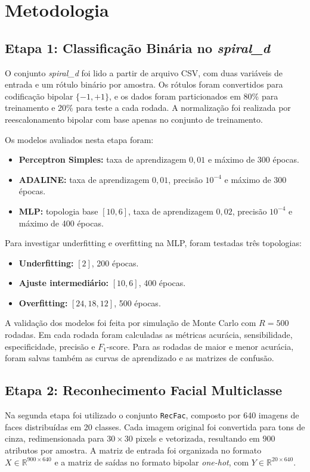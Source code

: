 \documentclass[journal,onecolumn]{IEEEtran}
\begin{document}
\section{Metodologia}

\subsection{Etapa 1: Classificação Binária no \textit{spiral\_d}}
O conjunto \textit{spiral\_d} foi lido a partir de arquivo CSV, com duas variáveis de entrada e um rótulo binário por amostra. Os rótulos foram convertidos para codificação bipolar $\{-1,+1\}$, e os dados foram particionados em 80\% para treinamento e 20\% para teste a cada rodada. A normalização foi realizada por reescalonamento bipolar com base apenas no conjunto de treinamento.

Os modelos avaliados nesta etapa foram:
\begin{itemize}
    \item \textbf{Perceptron Simples:} taxa de aprendizagem $0{,}01$ e máximo de 300 épocas.
    \item \textbf{ADALINE:} taxa de aprendizagem $0{,}01$, precisão $10^{-4}$ e máximo de 300 épocas.
    \item \textbf{MLP:} topologia base $[10,6]$, taxa de aprendizagem $0{,}02$, precisão $10^{-4}$ e máximo de 400 épocas.
\end{itemize}

Para investigar underfitting e overfitting na MLP, foram testadas três topologias:
\begin{itemize}
    \item \textbf{Underfitting:} $[2]$, 200 épocas.
    \item \textbf{Ajuste intermediário:} $[10,6]$, 400 épocas.
    \item \textbf{Overfitting:} $[24,18,12]$, 500 épocas.
\end{itemize}

A validação dos modelos foi feita por simulação de Monte Carlo com $R=500$ rodadas. Em cada rodada foram calculadas as métricas acurácia, sensibilidade, especificidade, precisão e $F_{1}$-score. Para as rodadas de maior e menor acurácia, foram salvas também as curvas de aprendizado e as matrizes de confusão.

\subsection{Etapa 2: Reconhecimento Facial Multiclasse}
Na segunda etapa foi utilizado o conjunto \texttt{RecFac}, composto por 640 imagens de faces distribuídas em 20 classes. Cada imagem original foi convertida para tons de cinza, redimensionada para $30\times30$ pixels e vetorizada, resultando em $900$ atributos por amostra. A matriz de entrada foi organizada no formato $X \in \mathbb{R}^{900\times640}$ e a matriz de saídas no formato bipolar \textit{one-hot}, com $Y \in \mathbb{R}^{20\times640}$.
\end{document}
